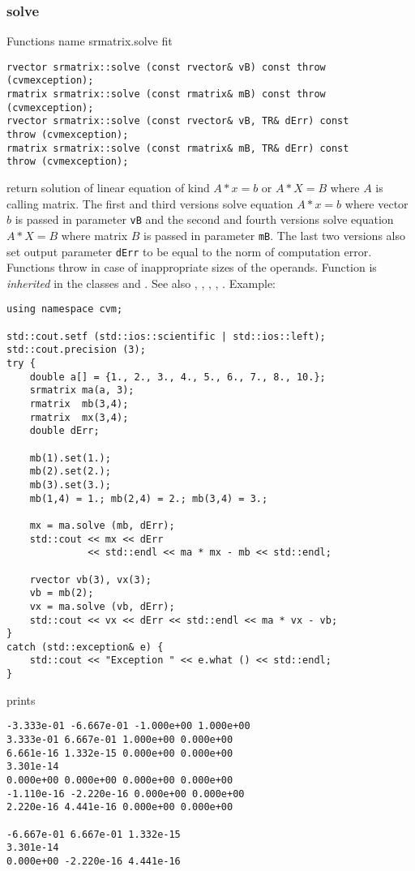 \subsubsection{solve}
Functions%
\pdfdest name {srmatrix.solve} fit
\begin{verbatim}
rvector srmatrix::solve (const rvector& vB) const throw (cvmexception);
rmatrix srmatrix::solve (const rmatrix& mB) const throw (cvmexception);
rvector srmatrix::solve (const rvector& vB, TR& dErr) const
throw (cvmexception);
rmatrix srmatrix::solve (const rmatrix& mB, TR& dErr) const
throw (cvmexception);
\end{verbatim}
return  solution of  linear equation of kind $A*x=b$ or $A*X=B$
where $A$ is  calling matrix. The first and third versions
solve equation $A*x=b$ where vector $b$ is passed in 
 parameter \verb"vB"
and the second and fourth versions
solve equation $A*X=B$ where matrix $B$ is passed 
in parameter \verb"mB".
The last two versions also set output parameter \verb"dErr" to be equal
to the norm of computation error.
Functions throw 
in case of inappropriate sizes of the operands.
Function is \emph{inherited} in the classes
and .
See also
,
,
,
,
.
Example:
\begin{Verbatim}
using namespace cvm;

std::cout.setf (std::ios::scientific | std::ios::left); 
std::cout.precision (3);
try {
    double a[] = {1., 2., 3., 4., 5., 6., 7., 8., 10.};
    srmatrix ma(a, 3);
    rmatrix  mb(3,4);
    rmatrix  mx(3,4);
    double dErr;

    mb(1).set(1.);
    mb(2).set(2.);
    mb(3).set(3.);
    mb(1,4) = 1.; mb(2,4) = 2.; mb(3,4) = 3.;

    mx = ma.solve (mb, dErr);
    std::cout << mx << dErr 
              << std::endl << ma * mx - mb << std::endl;

    rvector vb(3), vx(3);
    vb = mb(2);
    vx = ma.solve (vb, dErr);
    std::cout << vx << dErr << std::endl << ma * vx - vb;
}
catch (std::exception& e) {
    std::cout << "Exception " << e.what () << std::endl;
}
\end{Verbatim}
prints
\begin{Verbatim}
-3.333e-01 -6.667e-01 -1.000e+00 1.000e+00
3.333e-01 6.667e-01 1.000e+00 0.000e+00
6.661e-16 1.332e-15 0.000e+00 0.000e+00
3.301e-14
0.000e+00 0.000e+00 0.000e+00 0.000e+00
-1.110e-16 -2.220e-16 0.000e+00 0.000e+00
2.220e-16 4.441e-16 0.000e+00 0.000e+00

-6.667e-01 6.667e-01 1.332e-15
3.301e-14
0.000e+00 -2.220e-16 4.441e-16
\end{Verbatim}
\newpage







